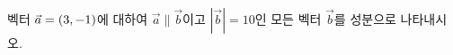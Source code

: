 벡터 $\vec{a}=(3{,}\mkern3mu\mathopen{}-1)$에 대하여 $\vec{a}\parallel\vec{b}$이고 $|\vec{b}|=10$인 모든 벡터 $\vec{b}$를 성분으로 나타내시오.

